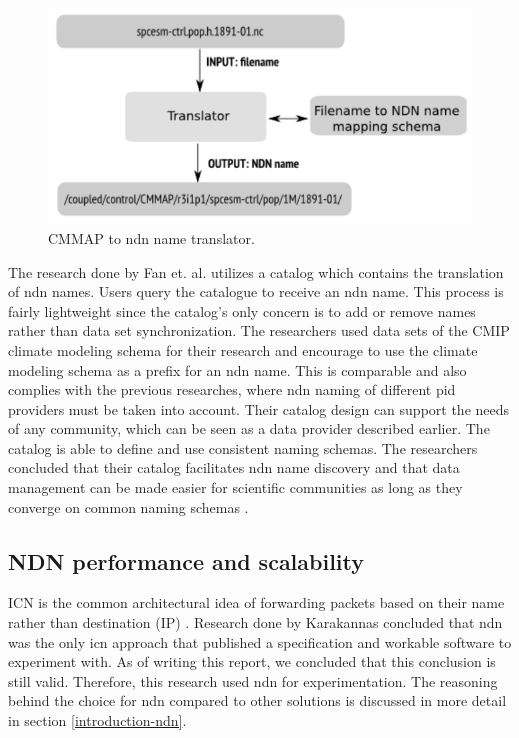 \begin{figure}[H]
\centering
\includegraphics[scale=0.4]{Images/cmip2ndn.png}
\caption{CMMAP to \gls{ndn} name translator.}
\label{fig:cmmap_ndnn}
\end{figure}

The research done by Fan et. al. utilizes a catalog which contains the translation of \gls{ndn} names. Users query the catalogue to receive an \gls{ndn} name. This process is fairly lightweight since the catalog's only concern is to add or remove names rather than data set synchronization. The researchers used data sets of the CMIP climate modeling schema for their research and encourage to use the climate modeling schema as a prefix for an \gls{ndn} name. This is comparable and also complies with the previous researches, where \gls{ndn} naming of different \gls{pid} providers must be taken into account.
Their catalog design can support the needs of any community, which can be seen as a data provider described earlier. The catalog is able to define and use consistent naming schemas.
The researchers concluded that their catalog facilitates \gls{ndn} name discovery and that data management can be made easier for scientific communities as long as they converge on common naming schemas \cite{ndn-man}. 

\subsection{NDN performance and scalability}
\label{introduction-related-work-ndn}
ICN is the common architectural idea of forwarding packets based on their name rather than destination (IP) \cite{jacobson2009networking}. Research done by Karakannas \cite{icn-bd} concluded that \gls{ndn} was the only \gls{icn} approach that published a specification and workable software to experiment with. As of writing this report, we concluded that this conclusion is still valid. Therefore, this research used \gls{ndn} for experimentation. The reasoning behind the choice for \gls{ndn} compared to other solutions is discussed in more detail in section \ref{introduction-ndn}.

